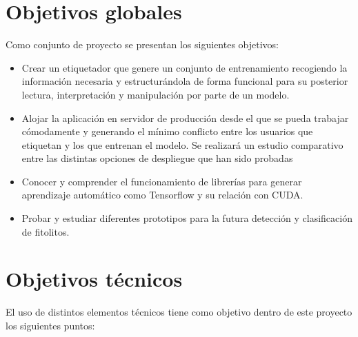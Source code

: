 
\section{Objetivos globales}

Como conjunto de proyecto se presentan los siguientes objetivos:

\begin{itemize}
	\item Crear un etiquetador que genere un conjunto de entrenamiento recogiendo la información necesaria y estructurándola de forma funcional para su posterior lectura, interpretación y manipulación por parte de un modelo.
	
	\item Alojar la aplicación en servidor de producción desde el que se pueda trabajar cómodamente y generando el mínimo conflicto entre los usuarios que etiquetan y los que entrenan el modelo. Se realizará un estudio comparativo entre las distintas opciones de despliegue que han sido probadas
	
	\item Conocer y comprender el funcionamiento de librerías para generar aprendizaje automático como Tensorflow y su relación con CUDA.
	
	\item Probar y estudiar diferentes prototipos para la futura detección y clasificación de fitolitos.
\end{itemize}

\section{Objetivos técnicos}

El uso de distintos elementos técnicos tiene como objetivo dentro de este proyecto los siguientes puntos:

